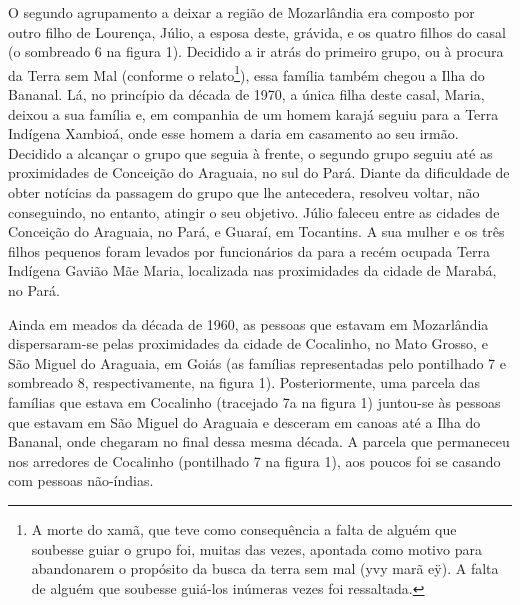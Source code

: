O segundo agrupamento a deixar a região de Mozarlândia era composto por
outro filho de Lourença, Júlio, a esposa deste, grávida, e os quatro
filhos do casal (o sombreado 6 na figura 1). Decidido a ir atrás do
primeiro grupo, ou à procura da Terra sem Mal (conforme o
relato\footnote{A morte do xamã, que teve como consequência a falta de
alguém que soubesse guiar o grupo foi, muitas das vezes, apontada como
motivo para abandonarem o propósito da busca da terra sem mal (yvy marã
eÿ). A falta de alguém que soubesse guiá-los inúmeras vezes foi
ressaltada.}), essa família também chegou a Ilha do Bananal. Lá, no
princípio da década de 1970, a única filha deste casal, Maria, deixou a
sua família e, em companhia de um homem karajá seguiu para a Terra
Indígena Xambioá, onde esse homem a daria em casamento ao seu irmão.
Decidido a alcançar o grupo que seguia à frente, o segundo grupo seguiu
até as proximidades de Conceição do Araguaia, no sul do Pará. Diante da
dificuldade de obter notícias da passagem do grupo que lhe antecedera,
resolveu voltar, não conseguindo, no entanto, atingir o seu objetivo.
Júlio faleceu entre as cidades de Conceição do Araguaia, no Pará, e
Guaraí, em Tocantins. A sua mulher e os três filhos pequenos foram
levados por funcionários da  para a recém ocupada Terra Indígena
Gavião Mãe Maria, localizada nas proximidades da cidade de Marabá, no
Pará. 

Ainda em meados da década de 1960, as pessoas que estavam em Mozarlândia
dispersaram-se pelas proximidades da cidade de Cocalinho, no Mato
Grosso, e São Miguel do Araguaia, em Goiás (as famílias representadas
pelo pontilhado 7 e sombreado 8, respectivamente, na figura 1).
Posteriormente, uma parcela das famílias que estava em Cocalinho
(tracejado 7a na figura 1) juntou-se às pessoas que estavam em São
Miguel do Araguaia e desceram em canoas até a Ilha do Bananal, onde
chegaram no final dessa mesma década. A parcela que permaneceu nos
arredores de Cocalinho (pontilhado 7 na figura 1), aos poucos foi se
casando com pessoas não-índias.  



